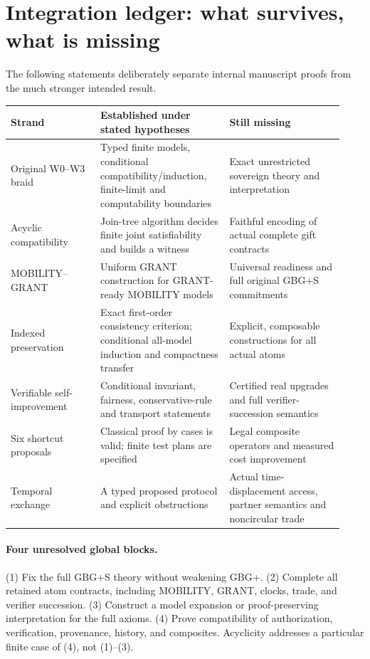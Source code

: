 \documentclass[11pt,letterpaper]{article}
\theoremstyle{definition}\newtheorem{definition}[theorem]{Definition}\newtheorem{example}[theorem]{Example}
\theoremstyle{remark}\newtheorem{remark}[theorem]{Remark}
\begin{document}
\section{Integration ledger: what survives, what is missing}\label{br:sec:integration-ledger}
The following statements deliberately separate internal manuscript proofs from the much stronger intended result.
\begin{longtable}{@{}p{0.25\linewidth}p{0.36\linewidth}p{0.32\linewidth}@{}}
\toprule
\textbf{Strand} & \textbf{Established under stated hypotheses} & \textbf{Still missing}\\\midrule\endhead
Original W0--W3 braid & Typed finite models, conditional compatibility/induction, finite-limit and computability boundaries & Exact unrestricted sovereign theory and interpretation \\
Acyclic compatibility & Join-tree algorithm decides finite joint satisfiability and builds a witness & Faithful encoding of actual complete gift contracts \\
MOBILITY--GRANT & Uniform GRANT construction for GRANT-ready MOBILITY models & Universal readiness and full original GBG+S commitments \\
Indexed preservation & Exact first-order consistency criterion; conditional all-model induction and compactness transfer & Explicit, composable constructions for all actual atoms \\
Verifiable self-improvement & Conditional invariant, fairness, conservative-rule and transport statements & Certified real upgrades and full verifier-succession semantics \\
Six shortcut proposals & Classical proof by cases is valid; finite test plans are specified & Legal composite operators and measured cost improvement \\
Temporal exchange & A typed proposed protocol and explicit obstructions & Actual time-displacement access, partner semantics and noncircular trade \\
\bottomrule
\end{longtable}

\paragraph{Four unresolved global blocks.} (1) Fix the full GBG+S theory without weakening GBG+. (2) Complete all retained atom contracts, including MOBILITY, GRANT, clocks, trade, and verifier succession. (3) Construct a model expansion or proof-preserving interpretation for the full axioms. (4) Prove compatibility of authorization, verification, provenance, history, and composites. Acyclicity addresses a particular finite case of (4), not (1)--(3).
\end{document}
